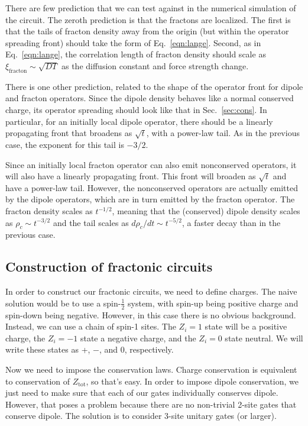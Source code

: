 \documentclass[a4paper,12pt]{article}
\renewcommand{\th}[1]{\frac{1}{#1}}
\begin{document}
There are few prediction that we can test against in the numerical simulation of the circuit. The zeroth prediction is that the fractons are localized. The first is that the tails of fracton density away from the origin (but within the operator spreading front) should take the form of Eq.~\ref{eqn:lange}. Second, as in Eq.~\ref{eqn:lange}, the correlation length of fracton density should scale as $\xi_\text{fracton}\sim \sqrt{DT}$ as the diffusion constant and force strength change. 

There is one other prediction, related to the shape of the operator front for dipole and fracton operators. Since the dipole density behaves like a normal conserved charge, its operator spreading should look like that in Sec.~\ref{sec:cons}. In particular, for an initially local dipole operator, there should be a linearly propagating front that broadens as $\sqrt{t}$, with a power-law tail. As in the previous case, the exponent for this tail is $-3/2$.

Since an initially local fracton operator can also emit nonconserved operators, it will also have a linearly propagating front. This front will broaden as $\sqrt{t}$ and have a power-law tail. However, the nonconserved operators are actually emitted by the dipole operators, which are in turn emitted by the fracton operator. The fracton density scales as $t^{-1/2}$, meaning that the (conserved) dipole density scales as $\rho_c\sim t^{-3/2}$ and the tail scales as $d\rho_c/dt\sim t^{-5/2}$, a faster decay than in the previous case. 

\subsection{Construction of fractonic circuits} \label{sub:construct}

In order to construct our fractonic circuits, we need to define charges. The naive solution would be to use a spin-$\th{2}$ system, with spin-up being positive charge and spin-down being negative. However, in this case there is no obvious background. Instead, we can use a chain of spin-1 sites. The $Z_i=1$ state will be a positive charge, the $Z_i=-1$ state a negative charge, and the $Z_i=0$ state neutral. We will write these states as +, $-$, and 0, respectively.

Now we need to impose the conservation laws. Charge conservation is equivalent to conservation of $Z_\text{tot}$, so that's easy. In order to impose dipole conservation, we just need to make sure that each of our gates individually conserves dipole. However, that poses a problem because there are no non-trivial 2-site gates that conserve dipole. The solution is to consider 3-site unitary gates (or larger).
\end{document}
